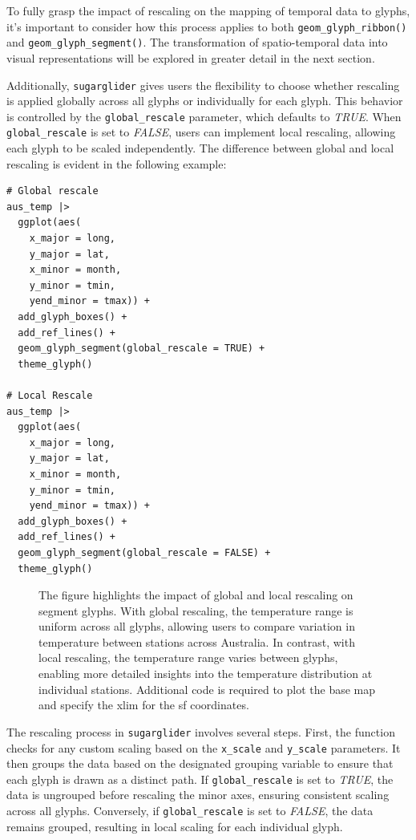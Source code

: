To fully grasp the impact of rescaling on the mapping of temporal data to glyphs, it's important to consider how this process applies to both \texttt{geom\_glyph\_ribbon()} and \texttt{geom\_glyph\_segment()}. The transformation of spatio-temporal data into visual representations will be explored in greater detail in the next section.

Additionally, \texttt{sugarglider} gives users the flexibility to choose whether rescaling is applied globally across all glyphs or individually for each glyph. This behavior is controlled by the \texttt{global\_rescale} parameter, which defaults to \emph{TRUE}. When \texttt{global\_rescale} is set to \emph{FALSE}, users can implement local rescaling, allowing each glyph to be scaled independently. The difference between global and local rescaling is evident in the following example:

\begin{verbatim}
# Global rescale
aus_temp |>
  ggplot(aes(
    x_major = long, 
    y_major = lat, 
    x_minor = month, 
    y_minor = tmin, 
    yend_minor = tmax)) +
  add_glyph_boxes() +
  add_ref_lines() +
  geom_glyph_segment(global_rescale = TRUE) +
  theme_glyph()

# Local Rescale
aus_temp |>
  ggplot(aes(
    x_major = long, 
    y_major = lat, 
    x_minor = month, 
    y_minor = tmin, 
    yend_minor = tmax)) +
  add_glyph_boxes() +
  add_ref_lines() +
  geom_glyph_segment(global_rescale = FALSE) +
  theme_glyph()
\end{verbatim}

\begin{figure}
\centering
{}
\caption{\label{fig:unnamed-chunk-6}The figure highlights the impact of global and local rescaling on segment glyphs. With global rescaling, the temperature range is uniform across all glyphs, allowing users to compare variation in temperature between stations across Australia. In contrast, with local rescaling, the temperature range varies between glyphs, enabling more detailed insights into the temperature distribution at individual stations. Additional code is required to plot the base map and specify the xlim for the sf coordinates.}
\end{figure}

The rescaling process in \texttt{sugarglider} involves several steps. First, the function checks for any custom scaling based on the \texttt{x\_scale} and \texttt{y\_scale} parameters. It then groups the data based on the designated grouping variable to ensure that each glyph is drawn as a distinct path. If \texttt{global\_rescale} is set to \emph{TRUE}, the data is ungrouped before rescaling the minor axes, ensuring consistent scaling across all glyphs. Conversely, if \texttt{global\_rescale} is set to \emph{FALSE}, the data remains grouped, resulting in local scaling for each individual glyph.

